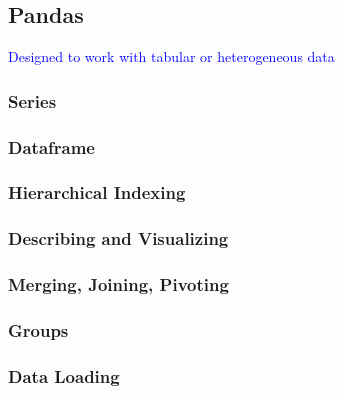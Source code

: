 \subsection{Pandas}

\textcolor{blue}{Designed to work with tabular or heterogeneous data}

\subsubsection{Series}

\subsubsection{Dataframe}

\subsubsection{Hierarchical Indexing}

\subsubsection{Describing and Visualizing}

\subsubsection{Merging, Joining, Pivoting}

\subsubsection{Groups}

\subsubsection{Data Loading}

